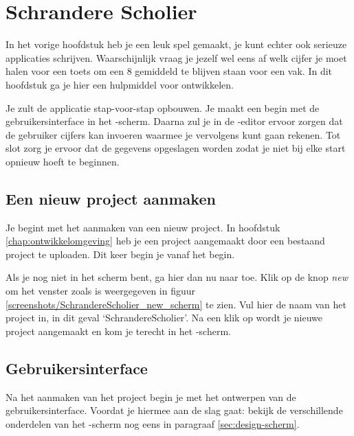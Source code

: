 \chapter{Schrandere Scholier}

In het vorige hoofdstuk heb je een leuk spel gemaakt, je kunt echter ook serieuze applicaties schrijven. Waarschijnlijk vraag je jezelf wel eens af welk cijfer je moet halen voor een toets om een 8 gemiddeld te blijven staan voor een vak. In dit hoofdstuk ga je hier een hulpmiddel voor ontwikkelen.

Je zult de applicatie stap-voor-stap opbouwen. Je maakt een begin met de gebruikersinterface in het -scherm. Daarna zul je in de -editor ervoor zorgen dat de gebruiker cijfers kan invoeren waarmee je vervolgens kunt gaan rekenen. Tot slot zorg je ervoor dat de gegevens opgeslagen worden zodat je niet bij elke start opnieuw hoeft te beginnen.

\section{Een nieuw project aanmaken}
Je begint met het aanmaken van een nieuw project. In hoofdstuk \ref{chap:ontwikkelomgeving} heb je een project aangemaakt door een bestaand project te uploaden. Dit keer begin je vanaf het begin. 

Als je nog niet in het  scherm bent, ga hier dan nu naar toe. Klik op de knop \emph{new} om het venster zoals is weergegeven in figuur \ref{screenshots/SchrandereScholier_new_scherm} te zien. Vul hier de naam van het project in, in dit geval `SchrandereScholier'. Na een klik op  wordt je nieuwe project aangemaakt en kom je terecht in het -scherm.

\section{Gebruikersinterface}
Na het aanmaken van het project begin je met het ontwerpen van de gebruikersinterface. Voordat je hiermee aan de slag gaat: bekijk de verschillende onderdelen van het -scherm nog eens in paragraaf \ref{sec:design-scherm}.

